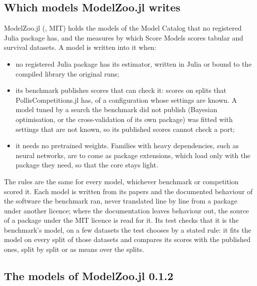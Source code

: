 \subsection{Which models ModelZoo.jl writes}

ModelZoo.jl (, MIT) holds the models of the Model Catalog that no registered
Julia package has, and the measures by which Score Models scores tabular and survival datasets. A model is written
into it when:

\begin{itemize}\setlength{\itemsep}{1pt}
\item no registered Julia package has its estimator, written in Julia or bound to the compiled library the original
  runs;
\item its benchmark publishes scores that can check it: scores on splits that PollisCompetitions.jl has, of a
  configuration whose settings are known. A model tuned by a search the benchmark did not publish (Bayesian
  optimisation, or the cross-validation of its own package) was fitted with settings that are not known, so its
  published scores cannot check a port;
\item it needs no pretrained weights. Families with heavy dependencies, such as neural networks, are to come as
  package extensions, which load only with the package they need, so that the core stays light.
\end{itemize}

The rules are the same for every model, whichever benchmark or competition scored it. Each model is written from its
papers and the documented behaviour of the software the benchmark ran, never translated line by line from a package
under another licence; where the documentation leaves behaviour out, the source of a package under the MIT licence is
read for it. Its test checks that it is the benchmark's model, on a few datasets the test chooses by a stated rule: it
fits the model on every split of those datasets and compares its scores with the published ones, split by split or as
means over the splits.

\subsection{The models of ModelZoo.jl 0.1.2}

